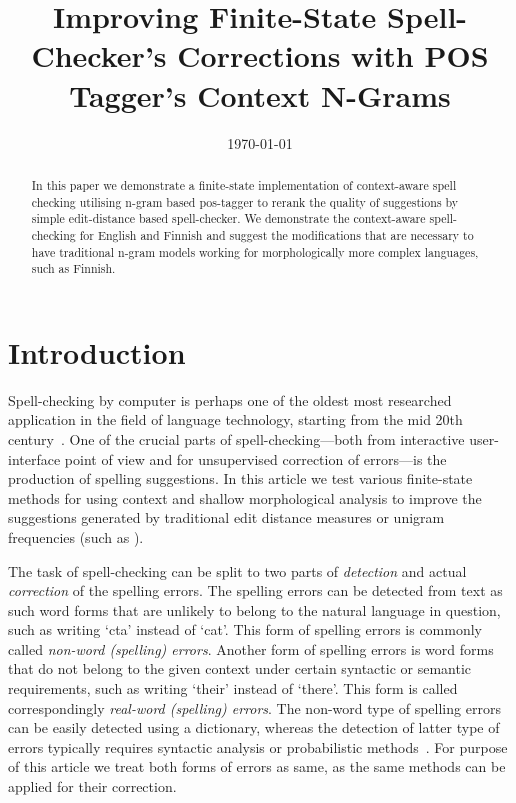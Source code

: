 \documentclass{llncs}
\begin{document}
\title{Improving Finite-State Spell-Checker's Corrections with POS Tagger's Context N-Grams}



\date{\today}

\maketitle

\begin{abstract}
  In this paper we demonstrate a finite-state implementation of context-aware
  spell checking utilising n-gram based pos-tagger to rerank the
  quality of suggestions by simple edit-distance based spell-checker. We
  demonstrate the context-aware spell-checking for English and Finnish and
  suggest the modifications that are necessary to have traditional n-gram
  models working for morphologically more complex languages, such as Finnish.
\end{abstract}

\section{Introduction}

Spell-checking by computer is perhaps one of the oldest most researched
application in the field of language technology, starting from the mid 20th
century~\cite{damerau/1964}. One of the crucial parts of spell-checking---both
from interactive user-interface point of view and for unsupervised correction
of errors---is the production of spelling suggestions.  In this article we test
various finite-state methods for using context and shallow morphological
analysis to improve the suggestions generated by traditional edit distance
measures or unigram frequencies (such as \cite{pirinen/2010/lrec}).

The task of spell-checking can be split to two parts of \emph{detection} and
actual \emph{correction} of the spelling errors. The spelling errors can be
detected from text as such word forms that are unlikely to belong to the
natural language in question, such as writing `cta' instead of `cat'. This form
of spelling errors is commonly called \emph{non-word (spelling) errors}.
Another form of spelling errors is word forms that do not belong to the given
context under certain syntactic or semantic requirements, such as writing
`their' instead of `there'. This form is called correspondingly \emph{real-word
(spelling) errors}. The non-word type of spelling errors can be easily detected
using a dictionary, whereas the detection of latter type of errors typically
requires syntactic analysis or probabilistic methods~\cite{mitton/2009}. For
purpose of this article we treat both forms of errors as same, as the same
methods can be applied for their correction.
\end{document}
